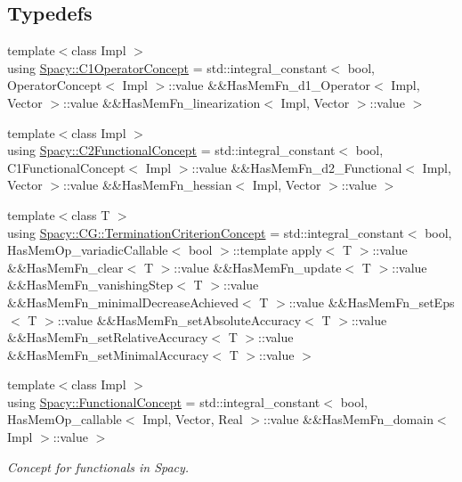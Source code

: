 \subsection*{Typedefs}
\begin{DoxyCompactItemize}
\item 
{\footnotesize template$<$class Impl $>$ }\\using \hyperlink{group__ConceptGroup_ga61ea9fe1d23e9f45e4e5fe940fe0e0cb}{Spacy\+::\+C1\+Operator\+Concept} = std\+::integral\+\_\+constant$<$ bool, Operator\+Concept$<$ Impl $>$\+::value \&\&Has\+Mem\+Fn\+\_\+d1\+\_\+\+Operator$<$ Impl, Vector $>$\+::value \&\&Has\+Mem\+Fn\+\_\+linearization$<$ Impl, Vector $>$\+::value $>$
\item 
{\footnotesize template$<$class Impl $>$ }\\using \hyperlink{group__ConceptGroup_ga265f0821ce6e0688d6e9abb8d8e0af6a}{Spacy\+::\+C2\+Functional\+Concept} = std\+::integral\+\_\+constant$<$ bool, C1\+Functional\+Concept$<$ Impl $>$\+::value \&\&Has\+Mem\+Fn\+\_\+d2\+\_\+\+Functional$<$ Impl, Vector $>$\+::value \&\&Has\+Mem\+Fn\+\_\+hessian$<$ Impl, Vector $>$\+::value $>$
\item 
{\footnotesize template$<$class T $>$ }\\using \hyperlink{group__ConceptGroup_ga5a296e4942cbfeba1e8538594a6e9c26}{Spacy\+::\+C\+G\+::\+Termination\+Criterion\+Concept} = std\+::integral\+\_\+constant$<$ bool, Has\+Mem\+Op\+\_\+variadic\+Callable$<$ bool $>$\+::template apply$<$ T $>$\+::value \&\&Has\+Mem\+Fn\+\_\+clear$<$ T $>$\+::value \&\&Has\+Mem\+Fn\+\_\+update$<$ T $>$\+::value \&\&Has\+Mem\+Fn\+\_\+vanishing\+Step$<$ T $>$\+::value \&\&Has\+Mem\+Fn\+\_\+minimal\+Decrease\+Achieved$<$ T $>$\+::value \&\&Has\+Mem\+Fn\+\_\+set\+Eps$<$ T $>$\+::value \&\&Has\+Mem\+Fn\+\_\+set\+Absolute\+Accuracy$<$ T $>$\+::value \&\&Has\+Mem\+Fn\+\_\+set\+Relative\+Accuracy$<$ T $>$\+::value \&\&Has\+Mem\+Fn\+\_\+set\+Minimal\+Accuracy$<$ T $>$\+::value $>$
\item 
{\footnotesize template$<$class Impl $>$ }\\using \hyperlink{group__ConceptGroup_gae45328d2e01ef6c8e5d948b69fda385f}{Spacy\+::\+Functional\+Concept} = std\+::integral\+\_\+constant$<$ bool, Has\+Mem\+Op\+\_\+callable$<$ Impl, Vector, Real $>$\+::value \&\&Has\+Mem\+Fn\+\_\+domain$<$ Impl $>$\+::value $>$
\begin{DoxyCompactList}\small\item\em Concept for functionals in Spacy. \end{DoxyCompactList}\item 

\end{DoxyCompactItemize}
